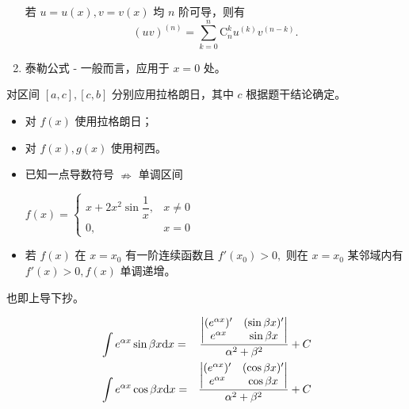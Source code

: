 \begin{Appendices}
\begin{enumerate}
    若 $ u = u(x),v = v(x) $ 均 $ n $ 阶可导，则有$$
        (uv)^{(n)} = \sum_{k=0}^n\mathrm{C}_n^k u^{(k)} v^{(n-k)}.
    $$ 
    \item 泰勒公式 - 一般而言，应用于 $ x = 0 $ 处。
\end{enumerate}


对区间 $ [a,c],[c,b] $ 分别应用拉格朗日，其中 $ c $ 根据题干结论确定。


\begin{itemize}
    \item 对 $ f(x) $ 使用拉格朗日；
    \item 对 $ f(x),g(x) $ 使用柯西。
\end{itemize}


\begin{itemize}
    \item 已知一点导数符号 $ \nRightarrow $ 单调区间
    
    $ f(x) = \begin{cases}x+2x^2\sin \dfrac{1}{x},& x\neq 0\\ 0,& x = 0\end{cases} $ 
    \item 若 $ f(x) $ 在 $ x = x_0 $ 有一阶连续函数且 $ f'(x_0) > 0, $ 
    则在 $ x = x_0 $ 某邻域内有 $ f'(x)>0, f(x) $ 单调递增。
\end{itemize}


也即上导下抄。

\begin{equation*}
    \begin{aligned}
        &\int e^{\alpha x} \sin \beta x \mathrm{d}x 
        =& \dfrac{ \displaystyle 
        \left|\begin{matrix}
            (e^{\alpha x})' & (\sin \beta x)' \\ 
            e^{\alpha x} & \sin \beta x 
        \end{matrix}\right|
        }{\alpha^2 + \beta^2} + C \\ 
        &\int e^{\alpha x} \cos \beta x \mathrm{d}x 
        =& \dfrac{ \displaystyle 
        \left|\begin{matrix}
            (e^{\alpha x})' & (\cos \beta x)' \\ 
            e^{\alpha x} & \cos \beta x 
        \end{matrix}\right|
        }{\alpha^2 + \beta^2} + C \\ 
    \end{aligned}
\end{equation*}


\end{Appendices}
